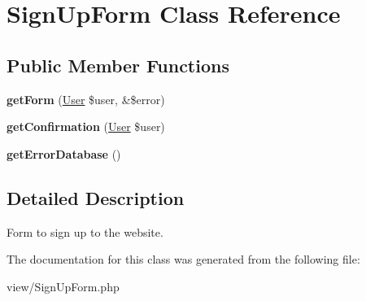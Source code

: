\hypertarget{classSignUpForm}{\section{Sign\+Up\+Form Class Reference}
\label{classSignUpForm}
}
\subsection*{Public Member Functions}
\begin{DoxyCompactItemize}
\item 
\hypertarget{classSignUpForm_aa8e3a5c4549fa6c9d9d24d726526d73c}{{\bfseries get\+Form} (\hyperlink{classUser}{User} \$user, \&\$error)}\label{classSignUpForm_aa8e3a5c4549fa6c9d9d24d726526d73c}

\item 
\hypertarget{classSignUpForm_a0b21f4063e8f78696e8b7660835aae77}{{\bfseries get\+Confirmation} (\hyperlink{classUser}{User} \$user)}\label{classSignUpForm_a0b21f4063e8f78696e8b7660835aae77}

\item 
\hypertarget{classSignUpForm_ac54e5245ba11e58453cbdfdb300abda2}{{\bfseries get\+Error\+Database} ()}\label{classSignUpForm_ac54e5245ba11e58453cbdfdb300abda2}

\end{DoxyCompactItemize}


\subsection{Detailed Description}
Form to sign up to the website. 

The documentation for this class was generated from the following file\+:\begin{DoxyCompactItemize}
\item 
view/Sign\+Up\+Form.\+php\end{DoxyCompactItemize}
